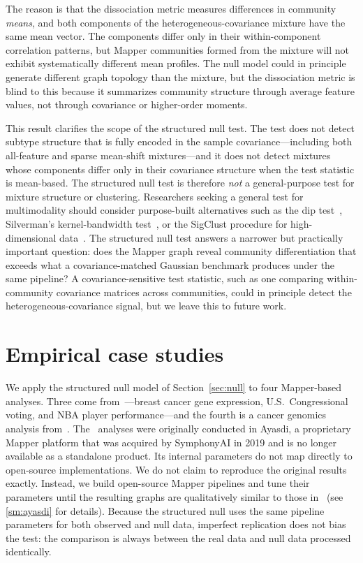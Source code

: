 \documentclass[hidelinks]{siamart251216}
\begin{document}
The reason is that the dissociation metric measures differences in
community \emph{means}, and both components of the heterogeneous-covariance
mixture have the same mean vector.  The components differ only in
their within-component correlation patterns, but Mapper communities
formed from the mixture will not exhibit systematically different mean
profiles.  The null model could in principle generate different graph
topology than the mixture, but the dissociation metric is blind to this
because it summarizes community structure through average feature
values, not through covariance or higher-order moments.

This result clarifies the scope of the structured null test.  The test
does not detect subtype structure that is fully encoded in the sample
covariance---including both all-feature and sparse mean-shift
mixtures---and it does not detect mixtures whose components differ only
in their covariance structure when the test statistic is mean-based.
The structured null test is therefore \emph{not} a general-purpose
test for mixture structure or clustering.  Researchers seeking a general test for multimodality should consider
purpose-built alternatives such as the dip
test~\citep{Hartigan1985}, Silverman's kernel-bandwidth
test~\citep{Silverman1981}, or the SigClust procedure for
high-dimensional data~\citep{Liu2008}.  The structured null test
answers a narrower but practically important question: does the Mapper
graph reveal community differentiation that exceeds what a
covariance-matched Gaussian benchmark produces under the same pipeline?
A covariance-sensitive test statistic, such as one comparing
within-community covariance matrices across communities, could in
principle detect the heterogeneous-covariance signal, but we leave this
to future work.



\section{Empirical case studies}\label{sec:results}

We apply the structured null model of Section~\ref{sec:null} to four
Mapper-based analyses.  Three come from~\cite{Lum2013}---breast cancer
gene expression, U.S.\ Congressional voting, and NBA player
performance---and the fourth is a cancer genomics analysis
from~\cite{RabadanCamara2020}.  The~\cite{Lum2013} analyses were
originally conducted in Ayasdi, a proprietary Mapper platform that
was acquired by SymphonyAI in 2019 and is no longer available as a
standalone product.  Its internal parameters do not map directly to
open-source implementations.  We do not claim to reproduce the original results exactly.  Instead,
we build open-source Mapper pipelines and tune their parameters until
the resulting graphs are qualitatively similar to those
in~\cite{Lum2013} (see \cref{sm:ayasdi} for details).  Because the
structured null uses the same pipeline parameters for both observed
and null data, imperfect replication does not bias the test: the
comparison is always between the real data and null data processed
identically.
\end{document}
